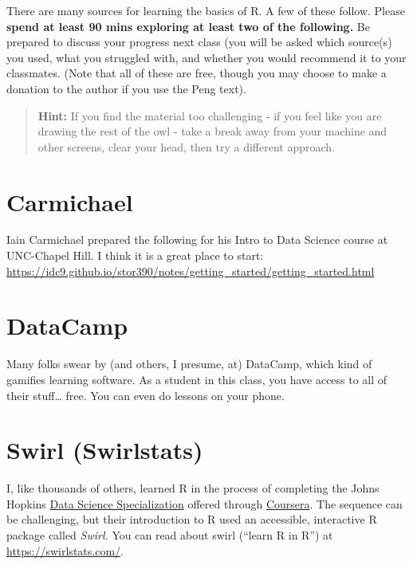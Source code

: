 \documentclass[
  openany]{book}
\begin{document}
There are many sources for learning the basics of R. A few of these follow. Please \textbf{spend at least 90 mins exploring at least two of the following.} Be prepared to discuss your progress next class (you will be asked which source(s) you used, what you struggled with, and whether you would recommend it to your classmates. (Note that all of these are free, though you may choose to make a donation to the author if you use the Peng text).

\begin{quote}
\textbf{Hint:} If you find the material too challenging - if you feel like you are drawing the rest of the owl - take a break away from your machine and other screens, clear your head, then try a different approach.
\end{quote}

\hypertarget{carmichael}{%
\section{Carmichael}\label{carmichael}}

Iain Carmichael prepared the following for his Intro to Data Science course at UNC-Chapel Hill. I think it is a great place to start: \url{https://idc9.github.io/stor390/notes/getting_started/getting_started.html}

\hypertarget{datacamp}{%
\section{DataCamp}\label{datacamp}}

Many folks swear by (and others, I presume, at) DataCamp, which kind of gamifies learning software. As a student in this class, you have access to all of their stuff\ldots{} free. You can even do lessons on your phone.

\hypertarget{swirl-swirlstats}{%
\section{Swirl (Swirlstats)}\label{swirl-swirlstats}}

I, like thousands of others, learned R in the process of completing the Johns Hopkins \href{https://jhudatascience.org/courses.html}{Data Science Specialization} offered through \href{https://www.coursera.org/}{Coursera}. The sequence can be challenging, but their introduction to R used an accessible, interactive R package called \emph{Swirl.} You can read about swirl (``learn R in R'') at \url{https://swirlstats.com/}.
\end{document}
